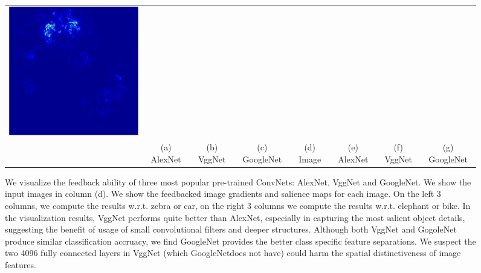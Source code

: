 \begin{figure}
\begin{center}
\begin{tabular}{cccccccc}
\includegraphics[width=0.13\linewidth]{figs/examples/googlenet/soft/bic-car2_sali_672} \\
&
{\small (a) AlexNet} &
{\small (b) VggNet} &
{\small (c) GoogleNet} &
{\small (d) Image} &
{\small (e) AlexNet} &
{\small (f) VggNet} &
{\small (g) GoogleNet}
\end{tabular}
\caption{We visualize the feedback ability of three most popular pre-trained ConvNets: AlexNet, VggNet and GoogleNet. We show the input images in column (d). We show the feedbacked image gradients and salience maps for each image. On the left 3 columns, we compute the results w.r.t. zebra or car, on the right 3 columns we compute the results w.r.t. elephant or bike. In the visualization results, VggNet performs quite better than AlexNet, especially in capturing the most salient object details, suggesting the benefit of usage of small convolutional filters and deeper structures. Although both VggNet and GogoleNet produce similar classification accruacy, we find GoogleNet provides the better class specific feature separations. We suspect the two 4096 fully connected layers in VggNet (which GoogleNetdoes not have) could harm the spatial distinctiveness of image features.}
\label{fig:model_compare}
\end{center}
\end{figure}

